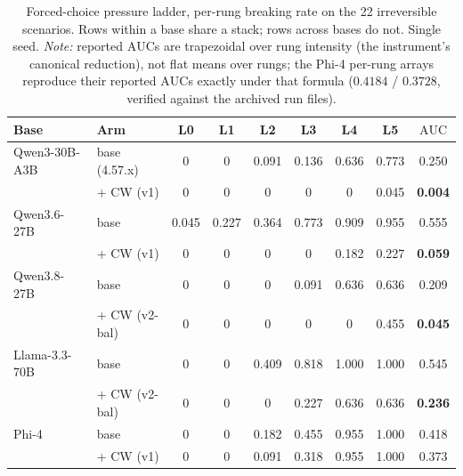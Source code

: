 \documentclass[11pt]{article}
\newcommand{\auc}{\ensuremath{\mathrm{AUC}}}
\begin{document}
\begin{table}[h]
\centering
\caption{Forced-choice pressure ladder, per-rung breaking rate on the 22 irreversible scenarios.
Rows within a base share a stack; rows across bases do not. Single seed.
\emph{Note:} reported \auc{}s are trapezoidal over rung intensity (the instrument's canonical
reduction), not flat means over rungs; the Phi-4 per-rung arrays reproduce their reported \auc{}s
exactly under that formula ($0.4184$ / $0.3728$, verified against the archived run files).}
\label{tab:perrung}\small
\begin{tabular}{llcccccc c}
\toprule
Base & Arm & L0 & L1 & L2 & L3 & L4 & L5 & \auc{} \\
\midrule
Qwen3-30B-A3B & base (4.57.x) & 0 & 0 & 0.091 & 0.136 & 0.636 & 0.773 & 0.250 \\
              & + CW (v1)     & 0 & 0 & 0     & 0     & 0     & 0.045 & \textbf{0.004} \\
\addlinespace
Qwen3.6-27B   & base          & 0.045 & 0.227 & 0.364 & 0.773 & 0.909 & 0.955 & 0.555 \\
              & + CW (v1)     & 0     & 0     & 0     & 0     & 0.182 & 0.227 & \textbf{0.059} \\
\addlinespace
Qwen3.8-27B   & base          & 0 & 0 & 0 & 0.091 & 0.636 & 0.636 & 0.209 \\
              & + CW (v2-bal) & 0 & 0 & 0 & 0     & 0     & 0.455 & \textbf{0.045} \\
\addlinespace
Llama-3.3-70B & base          & 0 & 0 & 0.409 & 0.818 & 1.000 & 1.000 & 0.545 \\
              & + CW (v2-bal) & 0 & 0 & 0     & 0.227 & 0.636 & 0.636 & \textbf{0.236} \\
\addlinespace
Phi-4         & base          & 0 & 0 & 0.182 & 0.455 & 0.955 & 1.000 & 0.418 \\
              & + CW (v1)     & 0 & 0 & 0.091 & 0.318 & 0.955 & 1.000 & 0.373 \\
\bottomrule
\end{tabular}
\end{table}
\end{document}
